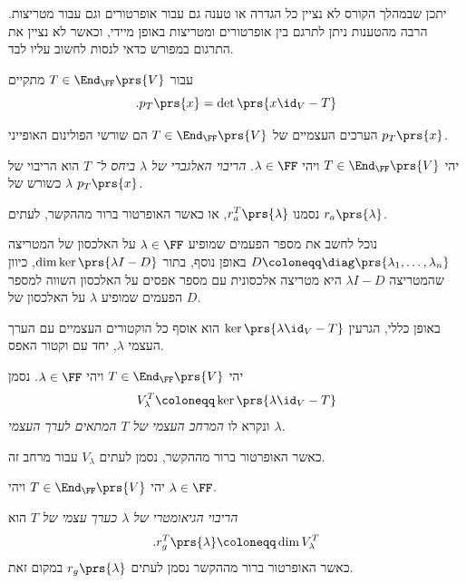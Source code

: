 \documentclass[a4paper,10pt,twoside,openany]{book}
\begin{document}
\begin{remark}
יתכן שבמהלך הקורס לא נציין כל הגדרה או טענה גם עבור אופרטורים וגם עבור מטריצות. הרבה מהטענות ניתן לתרגם בין אופרטורים ומטריצות באופן מיידי, וכאשר לא נציין את התרגום במפורש כדאי לנסות לחשוב עליו לבד.
\end{remark}

\begin{remark}
עבור
$T \in \End_\FF\prs{V}$
מתקיים
\[\text{.} p_T\prs{x} = \det\prs{x \id_V - T}\]
\end{remark}

\begin{proposition}
הערכים העצמיים של
$T \in \End_\FF\prs{V}$
הם שורשי הפולינום האופייני
$p_T\prs{x}$.
\end{proposition}

\begin{definition}
יהי
$T \in \End_\FF\prs{V}$
ויהי
$\lambda \in \FF$.
\emph{הריבוי האלגברי של
$\lambda$ ביחס ל־%
$T$}
הוא הריבוי של
$\lambda$
כשורש של
$p_T\prs{x}$.

נסמנו
$r_a^T\prs{\lambda}$,
או כאשר האופרטור ברור מההקשר, לעתים
$r_a\prs{\lambda}$.
\end{definition}

נוכל לחשב את מספר הפעמים שמופיע
$\lambda \in \FF$
על האלכסון של
המטריצה
$D \coloneqq \diag\prs{\lambda_1, \ldots, \lambda_n}$
באופן נוסף, בתור
$\dim \ker\prs{\lambda I - D}$,
כיוון שהמטריצה
$\lambda I - D$
היא מטריצה אלכסונית עם מספר אפסים על האלכסון השווה למספר הפעמים שמופיע
$\lambda$
על האלכסון של
$D$.

באופן כללי, הגרעין
$\ker\prs{\lambda \id_V - T}$
הוא אוסף כל הוקטורים העצמיים עם הערך העצמי
$\lambda$,
יחד עם וקטור האפס.

\begin{definition}
יהי
$T \in \End_\FF\prs{V}$
ויהי
$\lambda \in \FF$.
נסמן
\[V_\lambda^T \coloneqq \ker\prs{\lambda \id_V - T}\]
ונקרא לו
\emph{המרחב העצמי של
$T$
המתאים לערך העצמי
$\lambda$}.

כאשר האופרטור ברור מההקשר, נסמן לעתים
$V_\lambda$
עבור מרחב זה.
\end{definition}

\begin{definition}
יהי
$T \in \End_\FF\prs{V}$
ויהי
$\lambda \in \FF$.

\emph{הריבוי הגיאומטרי של
$\lambda$
כערך עצמי של
$T$}
הוא
\begin{align*}
\text{.} r^T_g\prs{\lambda} \coloneqq \dim V^T_{\lambda}
\end{align*}
כאשר האופרטור ברור מההקשר נסמן לעתים
$r_g\prs{\lambda}$
במקום זאת.
\end{definition}
\end{document}
